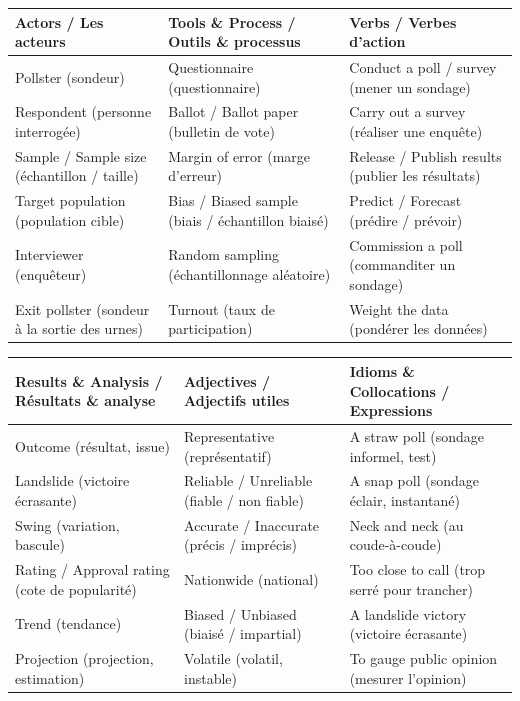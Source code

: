 \documentclass[11pt]{article}
\newcounter{popsec}
\newcounter{popsub}
\newcommand{\courssub}[1]{%
  \stepcounter{popsub}%
  \par\vspace{9pt}\noindent{\popxbold\fontsize{11.5}{13}\selectfont\color{popink}{\color{poporange}\thepopsec.\thepopsub}\hspace{6pt}#1}\par\nopagebreak\vspace{4pt}
}
\begin{document}
\begin{bilan}

\end{bilan}

\courssub{Lexique clé — English / Français}

\begin{center}
\begin{tabularx}{\linewidth}{|X|X|X|}
\hline
\rowcolor{popblueL}
\textbf{Actors / Les acteurs} & \textbf{Tools \& Process / Outils \& processus} & \textbf{Verbs / Verbes d'action} \\
\hline
Pollster (sondeur) & Questionnaire (questionnaire) & Conduct a poll / survey (mener un sondage) \\
Respondent (personne interrogée) & Ballot / Ballot paper (bulletin de vote) & Carry out a survey (réaliser une enquête) \\
Sample / Sample size (échantillon / taille) & Margin of error (marge d'erreur) & Release / Publish results (publier les résultats) \\
Target population (population cible) & Bias / Biased sample (biais / échantillon biaisé) & Predict / Forecast (prédire / prévoir) \\
Interviewer (enquêteur) & Random sampling (échantillonnage aléatoire) & Commission a poll (commanditer un sondage) \\
Exit pollster (sondeur à la sortie des urnes) & Turnout (taux de participation) & Weight the data (pondérer les données) \\
\hline
\end{tabularx}
\end{center}

\vspace{0.5em}

\begin{center}
\begin{tabularx}{\linewidth}{|X|X|X|}
\hline
\rowcolor{poporangeL}
\textbf{Results \& Analysis / Résultats \& analyse} & \textbf{Adjectives / Adjectifs utiles} & \textbf{Idioms \& Collocations / Expressions} \\
\hline
Outcome (résultat, issue) & Representative (représentatif) & A straw poll (sondage informel, test) \\
Landslide (victoire écrasante) & Reliable / Unreliable (fiable / non fiable) & A snap poll (sondage éclair, instantané) \\
Swing (variation, bascule) & Accurate / Inaccurate (précis / imprécis) & Neck and neck (au coude-à-coude) \\
Rating / Approval rating (cote de popularité) & Nationwide (national) & Too close to call (trop serré pour trancher) \\
Trend (tendance) & Biased / Unbiased (biaisé / impartial) & A landslide victory (victoire écrasante) \\
Projection (projection, estimation) & Volatile (volatil, instable) & To gauge public opinion (mesurer l'opinion) \\
\hline
\end{tabularx}
\end{center}
\end{document}
